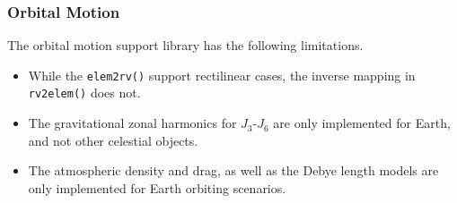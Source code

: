 \subsubsection{Orbital Motion}
The orbital motion support library has the following limitations.
\begin{itemize}
	\item While the {\tt elem2rv()} support rectilinear cases, the inverse mapping in {\tt rv2elem()} does not.
	\item The gravitational zonal harmonics for $J_{3}$-$J_{6}$ are only implemented for Earth, and not other celestial objects.
	\item The atmospheric density and drag, as well as the Debye length models are only implemented for Earth orbiting scenarios. 
\end{itemize}













